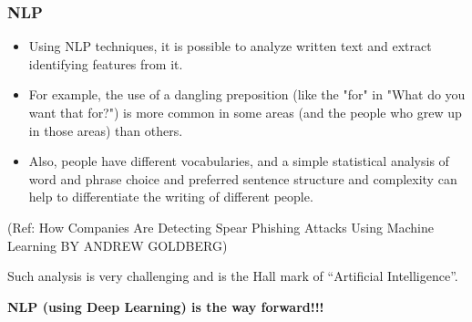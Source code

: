 
\begin{frame}[fragile]\frametitle{NLP}
\begin{itemize}
\item  Using NLP techniques, it is possible to analyze written text and extract identifying features from it. 
\item For example, the use of a dangling preposition (like the "for" in "What do you want that for?") is more common in some areas (and the people who grew up in those areas) than others. 
\item Also, people have different vocabularies, and a simple statistical analysis of word and phrase choice and preferred sentence structure and complexity can help to differentiate the writing of different people.
\end{itemize}

\tiny{(Ref: How Companies Are Detecting Spear Phishing Attacks Using Machine Learning BY ANDREW GOLDBERG)}

Such analysis is very challenging and is the Hall mark of ``Artificial Intelligence''. 

\textbf{NLP (using Deep Learning) is the way forward!!!}


\end{frame}
